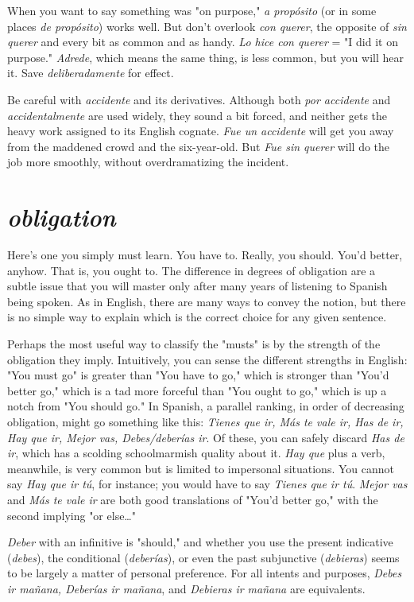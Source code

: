 When you want to say something was "on purpose,"
\emph{a propósito} (or in some places \emph{de propósito}) works well. But don't overlook
\emph{con querer}, the opposite of \emph{sin querer} and every bit as common and
as handy. \emph{Lo hice con querer} = "I did it on purpose." \emph{Adrede}, which
means the same thing, is less common, but you will hear it. Save \emph{deliberadamente} for effect.

Be careful with \emph{accidente} and its derivatives. Although both
\emph{por accidente} and \emph{accidentalmente} are used widely, they sound a bit
forced, and neither gets the heavy work assigned to its English cognate.
\emph{Fue un accidente} will get you away from the maddened crowd and the
six-year-old. But \emph{Fue sin querer} will do the job more smoothly, without overdramatizing the incident.

\section{\emph{obligation}}

Here's one you simply must learn. You have to. Really, you
should. You'd better, anyhow. That is, you ought to.
The difference in degrees of obligation are a subtle issue that
you will master only after many years of listening to Spanish being
spoken. As in English, there are many ways to convey the notion, but
there is no simple way to explain which is the correct choice for any
given sentence.

Perhaps the most useful way to classify the "musts" is by the
strength of the obligation they imply. Intuitively, you can sense the
different strengths in English: "You must go" is greater than "You have
to go," which is stronger than "You'd better go," which is a tad more
forceful than "You ought to go," which is up a notch from "You should
go." In Spanish, a parallel ranking, in order of decreasing obligation,
might go something like this: \emph{Tienes que ir, Más te vale ir, Has de ir,
Hay que ir, Mejor vas, Debes/deberías ir}. Of these, you can safely discard \emph{Has de ir}, which has a scolding schoolmarmish quality about it.
\emph{Hay que} plus a verb, meanwhile, is very common but is limited to impersonal situations. You cannot say \emph{Hay que ir tú}, for instance; you
would have to say \emph{Tienes que ir tú}. \emph{Mejor vas} and \emph{Más te vale ir} are
both good translations of "You'd better go," with the second implying
"or else\ldots{}"

\emph{Deber} with an infinitive is "should," and whether you use the
present indicative (\emph{debes}), the conditional (\emph{deberías}), or even the past
subjunctive (\emph{debieras}) seems to be largely a matter of personal preference. For all intents and purposes, \emph{Debes ir mañana, Deberías ir mañana}, and \emph{Debieras ir mañana} are equivalents.

